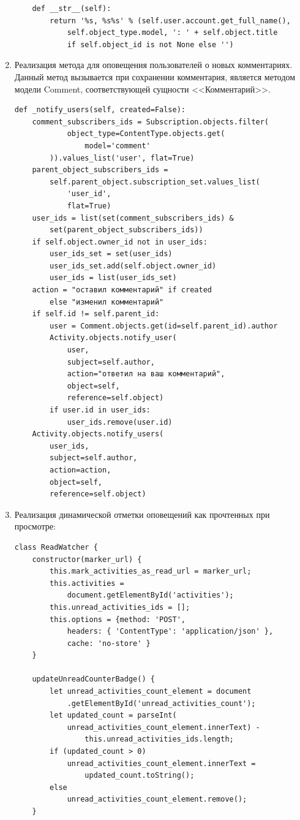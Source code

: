 \documentclass[14pt, a4paper, oneside]{extarticle}
\begin{document}
\begin{enumerate}[wide, labelindent=0pt]
{\begin{verbatim}
    def __str__(self):
        return '%s, %s%s' % (self.user.account.get_full_name(), 
            self.object_type.model, ': ' + self.object.title 
            if self.object_id is not None else '')
        \end{verbatim}
    }
    \item {
        Реализация метода для оповещения пользователей о новых комментариях. Данный метод вызывается при сохранении комментария, является методом модели Comment, соответствующей сущности <<Комментарий>>.\label{code:comment-notification}
        \begin{verbatim}
def _notify_users(self, created=False):
    comment_subscribers_ids = Subscription.objects.filter(
            object_type=ContentType.objects.get(
                model='comment'
        )).values_list('user', flat=True)
    parent_object_subscribers_ids = 
        self.parent_object.subscription_set.values_list(
            'user_id', 
            flat=True)
    user_ids = list(set(comment_subscribers_ids) & 
        set(parent_object_subscribers_ids))
    if self.object.owner_id not in user_ids:
        user_ids_set = set(user_ids)
        user_ids_set.add(self.object.owner_id)
        user_ids = list(user_ids_set)
    action = "оставил комментарий" if created 
        else "изменил комментарий"
    if self.id != self.parent_id:
        user = Comment.objects.get(id=self.parent_id).author
        Activity.objects.notify_user(
            user, 
            subject=self.author, 
            action="ответил на ваш комментарий", 
            object=self, 
            reference=self.object)
        if user.id in user_ids:
            user_ids.remove(user.id)
    Activity.objects.notify_users(
        user_ids, 
        subject=self.author, 
        action=action, 
        object=self, 
        reference=self.object)
        \end{verbatim}
    }
    \item {
        Реализация динамической отметки оповещений как прочтенных при просмотре:\label{code:mark-activities-as-read}
        \begin{verbatim}
class ReadWatcher {
    constructor(marker_url) {
        this.mark_activities_as_read_url = marker_url;
        this.activities = 
            document.getElementById('activities');
        this.unread_activities_ids = [];
        this.options = {method: 'POST', 
            headers: { 'ContentType': 'application/json' }, 
            cache: 'no-store' }
    }

    updateUnreadCounterBadge() {
        let unread_activities_count_element = document
            .getElementById('unread_activities_count');
        let updated_count = parseInt(
            unread_activities_count_element.innerText) - 
                this.unread_activities_ids.length;
        if (updated_count > 0)
            unread_activities_count_element.innerText = 
                updated_count.toString();
        else
            unread_activities_count_element.remove();
    }


\end{verbatim}}
\end{enumerate}
\end{document}
